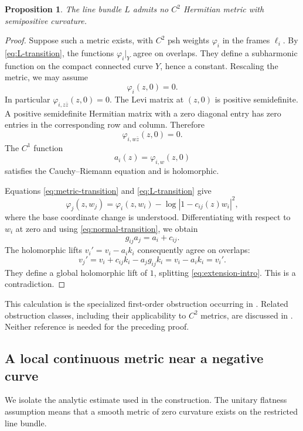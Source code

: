 \documentclass[11pt]{amsart}
\newtheorem{proposition}[theorem]{Proposition}
\theoremstyle{definition}
\theoremstyle{remark}
\numberwithin{equation}{section}
\begin{document}
\begin{proposition}\label{prop:no-metric}
The line bundle $L$ admits no $C^2$ Hermitian metric with semipositive
curvature.
\end{proposition}

\begin{proof}
Suppose such a metric exists, with $C^2$ psh weights $\varphi_i$ in the
frames $\ell_i$. By \eqref{eq:L-transition}, the functions
$\varphi_i|_Y$ agree on overlaps. They define a subharmonic function on
the compact connected curve $Y$, hence a constant. Rescaling the metric,
we may assume
\begin{equation}\label{eq:flat-value}
 \varphi_i(z,0)=0.
\end{equation}
In particular $\varphi_{i,z\bar z}(z,0)=0$. The Levi matrix at $(z,0)$
is positive semidefinite. A positive semidefinite Hermitian matrix with
a zero diagonal entry has zero entries in the corresponding row and
column. Therefore
\[
 \varphi_{i,w\bar z}(z,0)=0.
\]
The $C^1$ function
\[
 a_i(z)=\varphi_{i,w}(z,0)
\]
satisfies the Cauchy--Riemann equation and is holomorphic.

Equations \eqref{eq:metric-transition} and \eqref{eq:L-transition} give
\[
 \varphi_j(z,w_j)
 =\varphi_i(z,w_i)-\log|1-c_{ij}(z)w_i|^2,
\]
where the base coordinate change is understood. Differentiating with
respect to $w_i$ at zero and using \eqref{eq:normal-transition}, we obtain
\begin{equation}\label{eq:coboundary}
 g_{ij}a_j=a_i+c_{ij}.
\end{equation}
The holomorphic lifts $v_i'=v_i-a_ik_i$ consequently agree on overlaps:
\[
 v_j'=v_i+c_{ij}k_i-a_jg_{ij}k_i=v_i-a_ik_i=v_i'.
\]
They define a global holomorphic lift of $1$, splitting
\eqref{eq:extension-intro}. This is a contradiction.
\end{proof}

This calculation is the specialized first-order obstruction occurring
in \cite[Theorem~1.4 and Example~4.1]{Koike2021}. Related obstruction
classes, including their applicability to $C^2$ metrics, are discussed
in \cite{Wu2026}. Neither reference is needed for the preceding proof.

\subsection{A local continuous metric near a negative curve}\label{sec:cusp}

We isolate the analytic estimate used in the construction. The unitary
flatness assumption means that a smooth metric of zero curvature exists
on the restricted line bundle.
\end{document}
